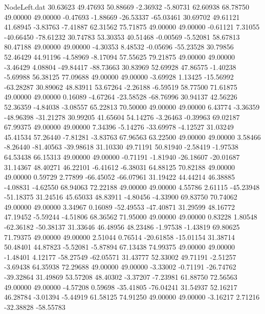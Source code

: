 \begin{filecontents}{NodeLeft.dat}
  30.63623   49.47693   50.88669    -2.36932   -5.80731   62.60938   68.78750   49.00000   49.00000   -0.47693   -1.88669  -26.53337  -65.03461
  30.69702   49.61121   41.68945    -3.83763   -7.41887   62.31562   75.71875   49.00000   49.00000   -0.61121    7.31055  -40.66450  -78.61232
  30.74783   53.30353   40.51468    -0.00569   -5.52081   58.67813   80.47188   49.00000   49.00000   -4.30353    8.48532   -0.05696  -55.23528
  30.79856   52.46429   44.91196    -4.58969   -8.17094   57.55625   79.21875   49.00000   49.00000   -3.46429    4.08804  -49.84417  -88.73663
  30.83969   52.69928   47.86575    -1.40238   -5.69988   56.38125   77.09688   49.00000   49.00000   -3.69928    1.13425  -15.56992  -63.28287
  30.89062   48.83911   53.67264    -2.26188   -6.59519   58.77500   71.61875   49.00000   49.00000    0.16089   -4.67264  -23.58528  -68.76996
  30.94137   42.56226   52.36359    -4.84038   -3.08557   65.22813   70.50000   49.00000   49.00000    6.43774   -3.36359  -48.96398  -31.21278
  30.99205   41.65604   54.14276    -3.26463   -0.39963   69.02187   67.99375   49.00000   49.00000    7.34396   -5.14276  -33.69978   -4.12527
  31.03249   45.41534   57.26440    -7.81281   -3.83763   67.96563   63.22500   49.00000   49.00000    3.58466   -8.26440  -81.40563  -39.98618
  31.10330   49.71191   50.81940    -2.58419   -1.97538   64.53438   66.15313   49.00000   49.00000   -0.71191   -1.81940  -26.18607  -20.01687
  31.14367   48.40271   46.22101    -6.41612   -6.38031   64.88125   70.82188   49.00000   49.00000    0.59729    2.77899  -66.45052  -66.07961
  31.19422   44.44214   46.38885    -4.08831   -4.62550   68.94063   72.22188   49.00000   49.00000    4.55786    2.61115  -45.23948  -51.18375
  31.24516   45.65033   48.83911    -4.80456   -4.33900   69.83750   70.74062   49.00000   49.00000    3.34967    0.16089  -52.49553  -47.40871
  31.29599   48.16772   47.19452    -5.59244   -4.51806   68.36562   71.95000   49.00000   49.00000    0.83228    1.80548  -62.36182  -50.38137
  31.33646   46.48956   48.23486    -1.97538   -1.43819   69.80625   71.79375   49.00000   49.00000    2.51044    0.76514  -20.61858  -15.01154
  31.38714   50.48401   44.87823    -5.52081   -5.87894   67.13438   74.99375   49.00000   49.00000   -1.48401    4.12177  -58.27549  -62.05571
  31.43777   52.33002   49.71191    -2.51257   -3.69438   64.35938   72.29688   49.00000   49.00000   -3.33002   -0.71191  -26.74762  -39.32864
  31.49869   53.57208   48.40302    -3.37207   -7.23981   61.88750   72.56563   49.00000   49.00000   -4.57208    0.59698  -35.41805  -76.04241
  31.54937   52.16217   46.28784    -3.01394   -5.44919   61.58125   74.91250   49.00000   49.00000   -3.16217    2.71216  -32.38828  -58.55783

\end{filecontents}
